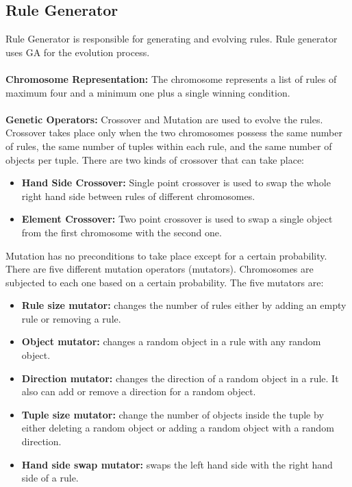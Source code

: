 \subsection{Rule Generator}
Rule Generator is responsible for generating and evolving rules. Rule generator uses GA for the evolution process.\\\\
\textbf{Chromosome Representation:} The chromosome represents a list of rules of maximum four and a minimum one plus a single winning condition. \\\\
\textbf{Genetic Operators:} Crossover and Mutation are used to evolve the rules. Crossover takes place only when the two chromosomes possess the same number of rules, the same number of tuples within each rule, and the same number of objects per tuple. There are two kinds of crossover that can take place:
\begin{itemize} \itemsep0pt \parskip0pt 
	\item \textbf{Hand Side Crossover:} Single point crossover is used to swap the whole right hand side between rules of different chromosomes.
	\item \textbf{Element Crossover:} Two point crossover is used to swap a single object from the first chromosome with the second one.
\end{itemize}

Mutation has no preconditions to take place except for a certain probability. There are five different mutation operators (mutators). Chromosomes are subjected to each one based on a certain probability. The five mutators are:
\begin{itemize} \itemsep0pt \parskip0pt 
	\item \textbf{Rule size mutator:} changes the number of rules either by adding an empty rule or removing a rule.
	\item \textbf{Object mutator:} changes a random object in a rule with any random object.
	\item \textbf{Direction mutator:} changes the direction of a random object in a rule. It also can add or remove a direction for a random object.
	\item \textbf{Tuple size mutator:} change the number of objects inside the tuple by either deleting a random object or adding a random object with a random direction.
	\item \textbf{Hand side swap mutator:} swaps the left hand side with the right hand side of a rule.
\end{itemize}

